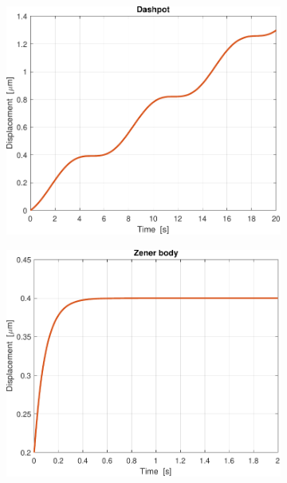 \begin{figure}[t!]
\begin{subfigure}{0.33\linewidth}
		\includegraphics[width=0.95\linewidth]{../code/figs/harmonic_dashpot_}
		\caption{}
	\end{subfigure}\hfill
	\begin{subfigure}{0.33\linewidth}
		\centering
		\includegraphics[width=0.95\linewidth]{../code/figs/step_zener_}
		\caption{}
	\end{subfigure}\hfill
	\begin{subfigure}{0.33\linewidth}
		\centering

\end{subfigure}
\end{figure}
